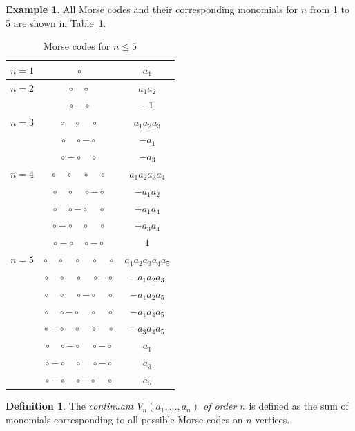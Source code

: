 \documentclass[a4paper,11pt]{amsart}
\theoremstyle{plain}
\theoremstyle{remark}
\theoremstyle{definition}
\newtheorem{definition}[theorem]{Definition}
\newtheorem{example}[theorem]{Example}
\numberwithin{equation}{section}
\numberwithin{figure}{section}
\begin{document}
\begin{example} All Morse codes and their corresponding monomials for $n$ from 1 to 5 are shown in Table~\ref{tab:morse}.
\end{example}

\begin{table}
\begin{tabular}{|l|c|c|}
\hline
$n=1$ & $\circ$ & $a_1$\\
\hline
$n=2$ & ${\circ}\quad{\circ}$ & $a_1a_2$\\
 & ${\circ}-{\circ}$ & $-1$\\
 \hline
$n=3$ & ${\circ}\quad{\circ}\quad{\circ}$ & $a_1a_2a_3$\\
 & ${\circ}\quad{\circ}-{\circ}$ & $-a_1$\\
  & ${\circ}-{\circ}\quad{\circ}$ & $-a_3$\\
\hline
$n=4$ &
$\circ\quad\circ\quad\circ\quad\circ$ & $a_1a_2a_3a_4$\\
&  $\circ\quad\circ\quad\circ-\circ$ & $-a_1a_2$\\
& $\circ\quad\circ-\circ\quad\circ$ & $-a_1a_4$\\\
& $\circ-\circ\quad\circ\quad\circ$ &$-a_3a_4$\\
& $\circ-\circ\quad\circ-\circ$ & $1$\\
\hline
$n=5$ &
$\circ\quad\circ\quad\circ\quad\circ\quad\circ$ & $a_1a_2a_3a_4a_5$\\
&$\circ\quad\circ\quad\circ\quad\circ- \circ$ & $-a_1a_2a_3$
\\
&$\circ\quad\circ\quad\circ-\circ\quad\circ$ & $-a_1a_2a_5$\\
&$\circ\quad\circ-\circ\quad\circ\quad\circ$ & $-a_1a_4a_5$\\
&$\circ-\circ\quad\circ\quad\circ\quad\circ$ & $-a_3a_4a_5$\\
&$\circ\quad\circ-\circ\quad\circ-\circ$ & $a_1$\\
&$\circ-\circ\quad\circ\quad\circ-\circ$ & $a_3$\\
&$\circ-\circ\quad\circ-\circ\quad\circ$ & $a_5$\\
\hline
\end{tabular}
\caption{Morse codes for $n\leq 5$}\label{tab:morse}	
\end{table}


\begin{definition}\label{def:euler} The \emph{continuant $V_n(a_1,\dots,a_n)$ of order $n$} is defined as the sum of monomials corresponding to all possible Morse codes on $n$ vertices.	
\end{definition}
\end{document}
